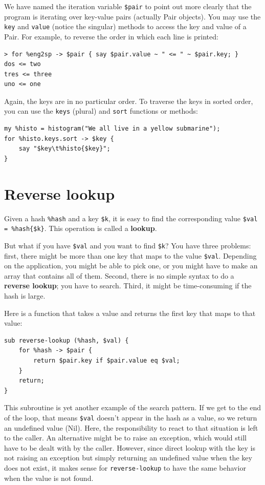 We have named the iteration variable \verb'$pair' to point 
out more clearly that the program is iterating over key-value 
pairs (actually Pair objects). You may use the {\tt key} and {\tt value} (notice 
the singular) methods to access the key and value of a Pair. 
For example, to reverse the order in which each line is printed:

\begin{verbatim}
> for %eng2sp -> $pair { say $pair.value ~ " <= " ~ $pair.key; }
dos <= two
tres <= three
uno <= one
\end{verbatim}

Again, the keys are in no particular order.  To traverse 
the keys in sorted order, you can use the {\tt keys} 
(plural) and {\tt sort} functions or methods:

\begin{verbatim}
my %histo = histogram("We all live in a yellow submarine");
for %histo.keys.sort -> $key {
    say "$key\t%histo{$key}";
}
\end{verbatim}



\section{Reverse lookup}
\label{raise}

Given a hash \verb'%hash' and a key \verb'$k', it is easy to
find the corresponding value \verb'$val = %hash{$k}'.  
This operation is called a {\bf lookup}.

But what if you have \verb'$val' and you want to find 
\verb'$k'? You have three problems: first, there might be 
more than one key that maps to the value \verb'$val'. Depending 
on the application, you might be able to pick one, or you 
might have to make an array that contains all of them.  
Second, there is no simple syntax to do a {\bf reverse lookup}; 
you have to search. Third, it might be time-consuming if 
the hash is large.

Here is a function that takes a value and returns the first
key that maps to that value:

\begin{verbatim}
sub reverse-lookup (%hash, $val) { 
    for %hash -> $pair { 
        return $pair.key if $pair.value eq $val;
    }
    return;
}
\end{verbatim}
%
This subroutine is yet another example of the search pattern.
If we get to the end of the loop, that means \verb'$val'
doesn't appear in the hash as a value, so we return an 
undefined value (Nil). Here, the responsibility to react 
to that situation is left to the caller. An alternative 
might be to raise an exception, which would still have 
to be dealt with by the caller. However, since direct 
lookup with the key is not raising an exception but simply 
returning an undefined value when the key does not exist, 
it makes sense for {\tt reverse-lookup} to have the same 
behavior when the value is not found.

